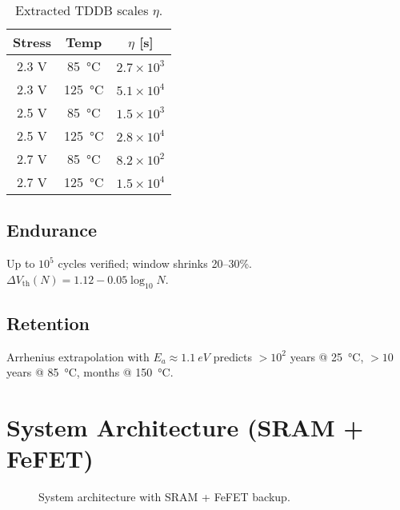 \documentclass[conference]{IEEEtran}
\begin{document}
\begin{table}[t]
\centering
\caption{Extracted TDDB scales \(\eta\).}
\begin{tabular}{@{}ccc@{}}
\toprule
Stress & Temp & \(\eta\) [s] \\
\midrule
2.3 V & \SI{85}{\celsius}  & \(2.7\times 10^{3}\) \\
2.3 V & \SI{125}{\celsius} & \(5.1\times 10^{4}\) \\
2.5 V & \SI{85}{\celsius}  & \(1.5\times 10^{3}\) \\
2.5 V & \SI{125}{\celsius} & \(2.8\times 10^{4}\) \\
2.7 V & \SI{85}{\celsius}  & \(8.2\times 10^{2}\) \\
2.7 V & \SI{125}{\celsius} & \(1.5\times 10^{4}\) \\
\bottomrule
\end{tabular}
\end{table}

\subsection{Endurance}
Up to \(10^{5}\) cycles verified; window shrinks 20–30\%.  
\(\Delta V_\mathrm{th}(N)=1.12-0.05\log_{10}N\).

\subsection{Retention}
Arrhenius extrapolation with \(E_a \approx \SI{1.1}{eV}\) predicts  
\(\gt 10^2\) years @ \SI{25}{\celsius},  
\(\gt 10\) years @ \SI{85}{\celsius},  
months @ \SI{150}{\celsius}.

\section{System Architecture (SRAM + FeFET)}
\begin{figure}[t]
\centering
{}
\caption{System architecture with SRAM + FeFET backup.}
\label{fig:system}
\end{figure}
\end{document}
